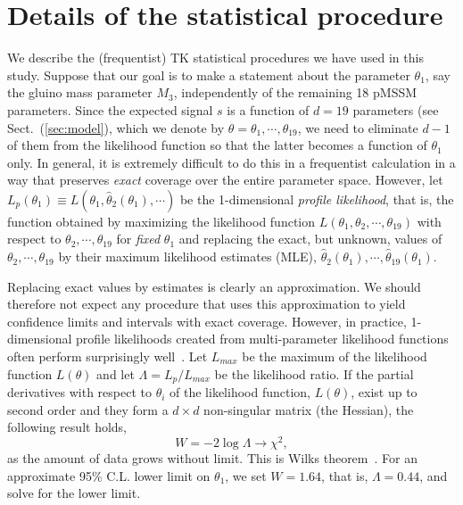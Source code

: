 \section{Details of the statistical procedure}
\label{sec:stat}
We describe the (frequentist) TK
statistical procedures we have used in this study.  Suppose 
that our goal is to make a statement about the parameter $\theta_1$,
say the gluino mass
parameter $M_3$, independently of the remaining 18 pMSSM parameters. Since the 
expected signal $s$ is a function of  $d = 19$ parameters (see Sect.~(\ref{sec:model}),
which we denote by $\theta = \theta_1,\cdots,\theta_{19}$,  we need to eliminate $d - 1$ of them from the likelihood function so that the latter becomes a function of $\theta_1$ only. In general, it is extremely difficult to do this in 
a frequentist calculation in a way that preserves \emph{exact} coverage over the entire parameter
space. However, let $L_p(\theta_1) \equiv L(\theta_1, \hat{\theta}_2(\theta_1), \cdots)$ be the 
1-dimensional \emph{profile likelihood}, that is, the function obtained by maximizing the likelihood function $L(\theta_1, \theta_2, \cdots, \theta_{19})$ with respect to $\theta_2,\cdots,\theta_{19}$ for \emph{fixed} $\theta_1$ and replacing the exact, but unknown, values of $\theta_2,\cdots,\theta_{19}$
by their maximum likelihood estimates (MLE),  $\hat{\theta}_2(\theta_1),\cdots,\hat{\theta}_{19}(\theta_1)$. 

Replacing exact values by estimates is clearly an approximation. We should therefore not
expect any procedure that uses this approximation to yield confidence limits and intervals
with exact coverage. However, in practice, 1-dimensional profile likelihoods created from
multi-parameter likelihood functions often perform
surprisingly well~\cite{James}.
Let $L_{max}$ be the maximum of the likelihood function $L(\theta)$ and let 
$\Lambda = L_p /  L_{max}$ be the likelihood ratio. 
If the partial derivatives with respect to $\theta_i$ of the likelihood function, $L(\theta)$, exist up to second order and they form a $d \times d$ non-singular matrix (the Hessian), 
the following result holds,
\begin{equation}
    W = -2\log\Lambda \rightarrow \chi^2,
\end{equation}
as the amount of data grows without limit. This is  Wilks theorem~\cite{Wilks, James}. For an 
approximate 95\% C.L. lower limit on $\theta_1$, we set $W = 1.64$, that is, $\Lambda = 0.44$,
and solve for the lower limit.

